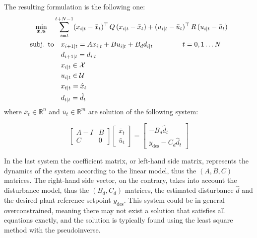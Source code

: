 \documentclass[a4paper,12pt,oneside]{book}
\begin{document}
The resulting formulation is the following one:
\begin{equation}
\begin{alignedat}{2}
	\min_{\substack{\boldsymbol{x}, \boldsymbol{u}}}\quad & \sum_{i=t}^{t+N-1} (x_{i|t} - \bar{x}_t) ^\top \, Q \, (x_{i|t} -  \bar{x}_t) +  (u_{i|t} - \bar{u}_t)^\top \, R \, (u_{i|t} - \bar{u}_t) &&  \\
	\text{subj. to} & \quad x_{i+1|t}  = A x_{i|t} + B u_{i|t} + B_d d_{i|t} \hspace{1.5cm} t = 0, 1 \ldots N &&  \\
    & \quad d_{i+1|t}  = d_{i|t} && \\
    &\quad x_{i|t} \in \mathcal{X} &&  \\
    &\quad u_{i|t} \in \mathcal{U} && \\
    &\quad x_{t|t} = \hat{x}_t && \\
    &\quad d_{t|t} = \hat{d}_t && 
\end{alignedat}
\label{MPC:offset-free}
\end{equation}
where $\bar{x}_t \in \mathbb{R}^n$ and $\bar{u}_t \in \mathbb{R}^m$ are solution of the following system:

\begin{equation}
    \begin{bmatrix}
    A-I & B \\
    C & 0
	\end{bmatrix}
 	\begin{bmatrix}
		\bar{x}_t \\
		\bar{u}_t
	\end{bmatrix}
    =
    \begin{bmatrix}
    -B_d \hat{d}_t\\
    y_{\text{des}} - C_d \hat{d}_t
	\end{bmatrix}
\end{equation}

In the last system the coefficient matrix, or left-hand side matrix, represents the dynamics of the system according to the linear model, thus the $(A, B, C)$ matrices.
The right-hand side vector, on the contrary, takes into account the disturbance model, thus the $(B_d, C_d)$ matrices, the estimated disturbance $\hat{d}$ and the desired plant reference setpoint $y_{\text{des}}$.
This system could be in general overconstrained, meaning there may not exist a solution that satisfies all equations exactly, and the solution is typically found using the least square method with the pseudoinverse.
\end{document}
